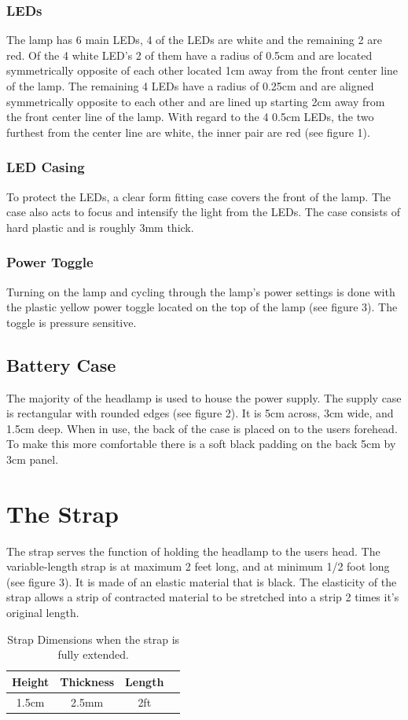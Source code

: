 \documentclass[12pt]{article}
\begin{document}
\subsubsection{LEDs}
The lamp has 6 main LEDs, 4 of the LEDs are white and the remaining 2 are red. Of the 4 white LED's
2 of them have a radius of 0.5cm and are located symmetrically opposite of each other located 1cm
away from the front center line of the lamp.  The remaining 4 LEDs have a radius of 0.25cm and are
aligned symmetrically opposite to each other and are lined up starting 2cm away from the front
center line of the lamp. With regard to the 4 0.5cm LEDs, the two furthest from the center line are
white, the inner pair are red (see figure 1).

\subsubsection{LED Casing}
To protect the LEDs, a clear form fitting case covers the front of the lamp.  The case also acts to
focus and intensify the light from the LEDs. The case consists of hard plastic and is roughly
3mm thick.

\subsubsection{Power Toggle}
Turning on the lamp and cycling through the lamp's power settings is done with the plastic yellow
power toggle located on the top of the lamp (see figure 3). The toggle is pressure sensitive.

\subsection{Battery Case}
The majority of the headlamp is used to house the power supply. The supply case is rectangular with
rounded edges (see figure 2). It is 5cm across, 3cm wide, and 1.5cm deep. When in use, the back of
the case is placed on to the users forehead. To make this more comfortable there is a soft black
padding on the back 5cm by 3cm panel.

\section{The Strap}
The strap serves the function of holding the headlamp to the users head. The variable-length strap
is at maximum 2 feet long, and at minimum 1/2 foot long (see figure 3). It is made of an elastic material that
is black. The elasticity of the strap allows a strip of contracted material to be stretched into a
strip 2 times it's original length.
\begin{table}
\begin{center}
\begin{tabular}{ | c | c | c | p{5cm} |}
    \hline
    Height & Thickness & Length \\ \hline
    1.5cm & 2.5mm & 2ft  \\ \hline
\end{tabular}
\end{center}
\caption[Strap Dimensions]{Strap Dimensions when the strap is fully extended.}

\end{table}
\end{document}
